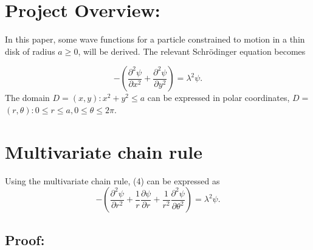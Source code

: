\documentclass{article}
\begin{document}
\section{Project Overview:}
In this paper, some wave functions for a particle constrained to motion in a thin disk of radius $a \ge 0$, will be derived. The relevant Schrödinger equation becomes

\begin{equation}
    -(\frac{\partial^2\psi}{\partial x^2} + \frac{\partial^2\psi}{\partial y^2} )=\lambda^2\psi.
\end{equation}
The domain $D=${$(x,y) : x^2 + y^2 \leq a$} can be expressed in polar coordinates, $D=${$(r,\theta) : 0\leq r \leq a, 0 \leq \theta \leq 2\pi$}.

\section{Multivariate chain rule}
Using the multivariate chain rule, (4) can be expressed as 
\begin{equation}
    -(\frac{\partial^2\psi}{\partial r^2} +\frac{1}{r} \frac{\partial\psi}{\partial r} +\frac{1}{r^2}\frac{\partial^2 \psi}{\partial \theta^2})=\lambda^2 \psi.
\end{equation}
\subsection{Proof:}
\end{document}
